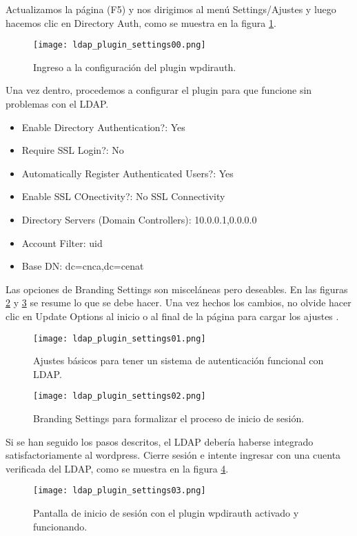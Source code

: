 Actualizamos la página (F5) y nos dirigimos al menú Settings/Ajustes y luego hacemos clic en Directory Auth, como se muestra en la figura \ref{fig:ldap:03}. 
\begin{figure}[H]
\centering
\texttt{[image: ldap\_plugin\_settings00.png]}
\caption{Ingreso a la configuración del plugin wpdirauth.}
\label{fig:ldap:03}
\end{figure}
Una vez dentro, procedemos a configurar el plugin para que funcione sin problemas con el LDAP.
\begin{itemize}
\item Enable Directory Authentication?: Yes
\item Require SSL Login?: No
\item Automatically Register Authenticated Users?: Yes
\item Enable SSL COnectivity?: No SSL Connectivity
\item Directory Servers (Domain Controllers): 10.0.0.1,0.0.0.0
\item Account Filter: uid
\item Base DN: dc=cnca,dc=cenat
\end{itemize}
Las opciones de Branding Settings son misceláneas pero deseables. En las figuras \ref{fig:ldap:04} y \ref{fig:ldap:05} se resume lo que se debe hacer. Una vez hechos los cambios, no olvide hacer clic en Update Options al inicio o al final de la página para cargar  los ajustes \cite{wpldap}.
\begin{figure}[H]
\centering
\texttt{[image: ldap\_plugin\_settings01.png]}
\caption{Ajustes básicos para tener un sistema de autenticación funcional con LDAP.}
\label{fig:ldap:04}
\end{figure}
\begin{figure}[H]
\centering
\texttt{[image: ldap\_plugin\_settings02.png]}
\caption{Branding Settings para formalizar el proceso de inicio de sesión.}
\label{fig:ldap:05}
\end{figure}
Si se han seguido los pasos descritos, el LDAP debería haberse  integrado satisfactoriamente al wordpress. Cierre sesión e intente ingresar con una cuenta verificada del LDAP, como se muestra en la  figura \ref{fig:ldap:06}.
\begin{figure}[H]
\centering
\texttt{[image: ldap\_plugin\_settings03.png]}
\caption{Pantalla de inicio de sesión con el plugin wpdirauth activado y funcionando.}
\label{fig:ldap:06}
\end{figure}
\clearpage